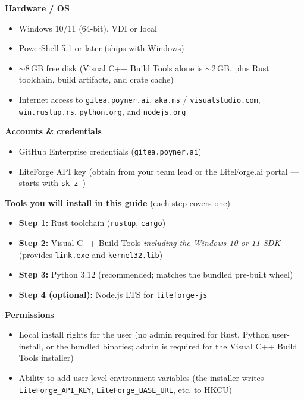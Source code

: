 \documentclass[11pt,letterpaper]{article}
\begin{document}
\begin{tcolorbox}[infobox={Prerequisites}]
\textbf{Hardware / OS}
\begin{itemize}[nosep]
  \item Windows 10/11 (64-bit), VDI or local
  \item PowerShell 5.1 or later (ships with Windows)
  \item $\sim$8\,GB free disk (Visual C++ Build Tools alone is $\sim$2\,GB,
    plus Rust toolchain, build artifacts, and crate cache)
  \item Internet access to \texttt{gitea.poyner.ai},
    \texttt{aka.ms} / \texttt{visualstudio.com}, \texttt{win.rustup.rs},
    \texttt{python.org}, and \texttt{nodejs.org}
\end{itemize}
\textbf{Accounts \& credentials}
\begin{itemize}[nosep]
  \item GitHub Enterprise credentials (\texttt{gitea.poyner.ai})
  \item LiteForge API key (obtain from your team lead or the LiteForge.ai portal ---
    starts with \texttt{sk-z-})
\end{itemize}
\textbf{Tools you will install in this guide} (each step covers one)
\begin{itemize}[nosep]
  \item \textbf{Step 1:} Rust toolchain (\texttt{rustup}, \texttt{cargo})
  \item \textbf{Step 2:} Visual C++ Build Tools \emph{including the
    Windows 10 or 11 SDK} (provides \texttt{link.exe} and
    \texttt{kernel32.lib})
  \item \textbf{Step 3:} Python 3.12 (recommended; matches the bundled
    pre-built wheel)
  \item \textbf{Step 4 (optional):} Node.js LTS for \texttt{liteforge-js}
\end{itemize}
\textbf{Permissions}
\begin{itemize}[nosep]
  \item Local install rights for the user (no admin required for Rust,
    Python user-install, or the bundled binaries; admin is required for
    the Visual C++ Build Tools installer)
  \item Ability to add user-level environment variables (the installer
    writes \texttt{LiteForge\_API\_KEY}, \texttt{LiteForge\_BASE\_URL}, etc. to
    HKCU)
\end{itemize}
\end{tcolorbox}
\end{document}
